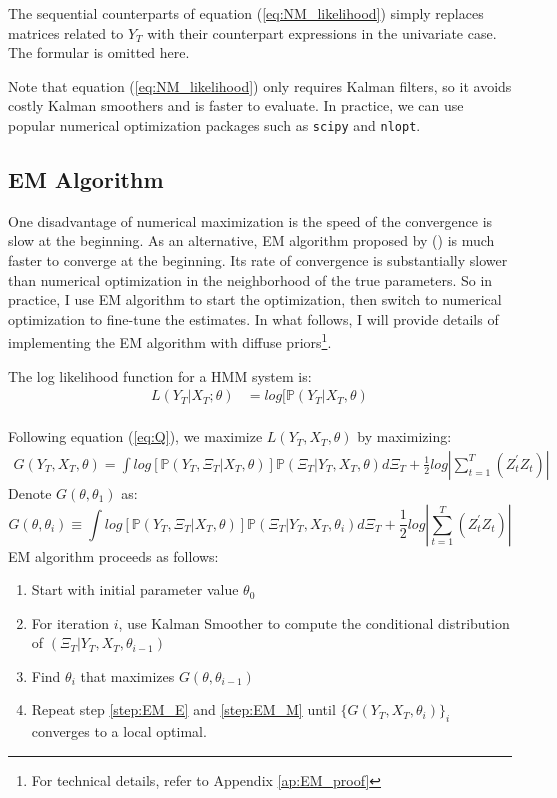 \documentclass[10pt]{article}
\newenvironment{boenumerate}
    {\begin{enumerate}\renewcommand\labelenumi{\textbf\theenumi}}
    {\end{enumerate}}
\numberwithin{equation}{section}
\begin{document}
The sequential counterparts of equation (\ref{eq:NM_likelihood}) simply replaces matrices related to $Y_T$ with their counterpart expressions in the univariate case. The formular is omitted here.

Note that equation (\ref{eq:NM_likelihood}) only requires Kalman filters, so it avoids costly Kalman smoothers and is faster to evaluate. In practice, we can use popular numerical optimization packages such as \texttt{scipy} and \texttt{nlopt}.

\subsection{EM Algorithm} \label{subsec:EM}
One disadvantage of numerical maximization is the speed of the convergence is slow at the beginning. As an alternative, EM algorithm proposed by (\cite{shumway_stoffer_1982}) is much faster to converge at the beginning. Its rate of convergence is substantially slower than numerical optimization in the neighborhood of the true parameters. So in practice, I use EM algorithm to start the optimization, then switch to numerical optimization to fine-tune the estimates. In what follows, I will provide details of implementing the EM algorithm with diffuse priors\footnote{For technical details, refer to Appendix \ref{ap:EM_proof}}.  

The log likelihood function for a HMM system is:
\begin{align*}
    L(Y_T|X_T; \theta) &= log[\mathbb{P}(Y_T|X_T,\theta) \\
\end{align*}

Following equation (\ref{eq:Q}), we maximize $L(Y_T,X_T,\theta)$ by maximizing: 
\begin{align*}
    G(Y_T,X_T,\theta) = \int log[\mathbb{P}(Y_T,\Xi_T|X_T,\theta)]\mathbb{P}(\Xi_T|Y_T,X_T,\theta)d\Xi_T + \frac{1}{2}log\left|\sum_{t=1}^{T}(Z_t^{'}Z_t)\right| 
\end{align*}
Denote $G(\theta,\theta_1)$ as: 
\[
    G(\theta,\theta_i) \equiv \int log[\mathbb{P}(Y_T,\Xi_T|X_T,\theta)]\mathbb{P}(\Xi_T|Y_T,X_T,\theta_i)d\Xi_T + \frac{1}{2}log\left|\sum_{t=1}^{T}(Z_t^{'}Z_t)\right| 
\]
EM algorithm proceeds as follows:
\begin{boenumerate}
    \item Start with initial parameter value $\theta_0$
    \item \label{step:EM_E} For iteration $i$, use Kalman Smoother to compute the conditional distribution of $(\Xi_T|Y_T,X_T,\theta_{i-1})$
    \item \label{step:EM_M} Find $\theta_{i}$ that maximizes $G(\theta,\theta_{i-1})$    
    \item Repeat step \ref{step:EM_E} and \ref{step:EM_M} until $\{G(Y_T,X_T,\theta_i)\}_i$ converges to a local optimal.
\end{boenumerate}
\end{document}
